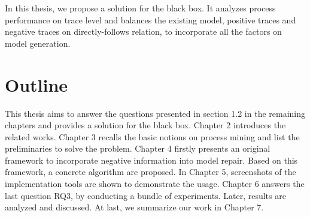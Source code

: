 In this thesis, we propose a solution for the black box. It analyzes process performance on trace level and balances the existing model, positive traces and negative traces on directly-follows relation, to incorporate all the factors on model generation. 

\section{Outline}
This thesis aims to answer the questions presented in section 1.2 in the remaining chapters and provides a solution for the black box. 
Chapter 2 introduces the related works. Chapter 3 recalls the basic notions on process mining and list the preliminaries to solve the problem. 
Chapter 4 firstly presents an original framework to incorporate negative information into model repair. Based on this framework, a concrete algorithm are proposed. 
In Chapter 5, screenshots of the implementation tools are shown to demonstrate the usage.  Chapter 6 answers the last question RQ3, by conducting a bundle of experiments. Later, results are analyzed and discussed. 
At last, we summarize our work in Chapter 7. 



%